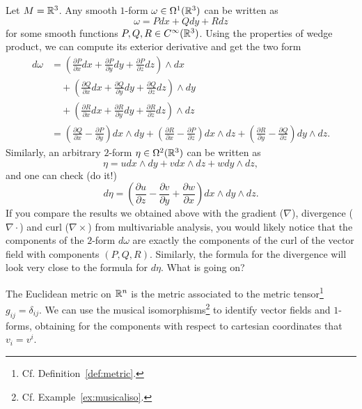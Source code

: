 \begin{example}
	Let $M=\mathbb{R}^3$. Any smooth $1$-form $\omega\in\Omega^1(\mathbb{R}^3)$ can be written as
	\begin{equation}
		\omega = P dx + Q dy + R dz
	\end{equation}
	for some smooth functions $P,Q,R\in C^\infty(\mathbb{R}^3)$.
	Using the properties of wedge product, we can compute its exterior derivative and get the two form
	\begin{align}
		d\omega & = \left(\frac{\partial P}{\partial x} dx + \frac{\partial P}{\partial y} dy + \frac{\partial P}{\partial z} dz \right) \wedge dx     \\
		        & \quad+\left(\frac{\partial Q}{\partial x} dx + \frac{\partial Q}{\partial y} dy + \frac{\partial Q}{\partial z} dz \right) \wedge dy \\
		        & \quad+\left(\frac{\partial R}{\partial x} dx + \frac{\partial R}{\partial y} dy + \frac{\partial R}{\partial z} dz \right) \wedge dz \\
		        & = \left(\frac{\partial Q}{\partial x} - \frac{\partial P}{\partial y}\right) dx \wedge dy +
		\left(\frac{\partial R}{\partial x} - \frac{\partial P}{\partial z}\right) dx \wedge dz + \left(\frac{\partial R}{\partial y} - \frac{\partial Q}{\partial z}\right) dy \wedge dz.
	\end{align}
	Similarly, an arbitrary $2$-form $\eta\in\Omega^2(\mathbb{R}^3)$ can be written as
	\begin{equation}
		\eta = u dx\wedge dy + v dx\wedge dz + w dy\wedge dz,
	\end{equation}
	and one can check (do it!)
	\begin{equation}
		d\eta = \left(\frac{\partial u}{\partial z}-\frac{\partial v}{\partial y} + \frac{\partial w}{\partial x}\right) dx\wedge dy \wedge dz.
	\end{equation}
	If you compare the results we obtained above with the gradient ($\nabla$), divergence ($\nabla\cdot$) and curl ($\nabla\times$) from multivariable analysis, you would likely notice that the components of the $2$-form $d\omega$ are exactly the components of the curl of the vector field with components $(P, Q, R)$.
	Similarly, the formula for the divergence will look very close to the formula for $d\eta$.
	What is going on?

	The Euclidean metric on $\mathbb{R}^n$ is the metric associated to the metric tensor\footnote{Cf. Definition~\ref{def:metric}.} $g_{ij} = \delta_{ij}$.
	We can use the musical isomorphisms\footnote{Cf. Example~\ref{ex:musicaliso}.} to identify vector fields and $1$-forms, obtaining for the components with respect to cartesian coordinates that $v_i = v^i$.


\end{example}
